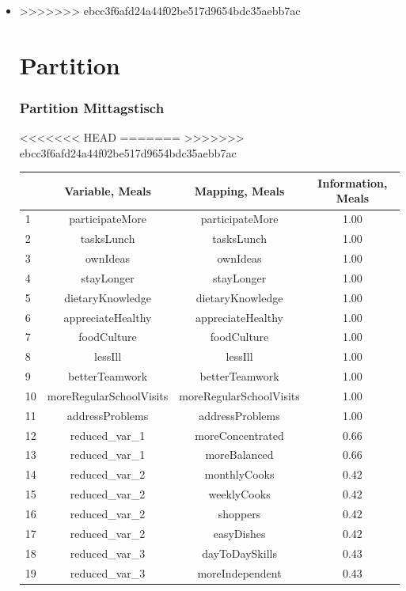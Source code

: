 \begin{frame}[fragile]
\begin{itemize}
\begin{frame}
\begin{itemize}
\item 
>>>>>>> ebcc3f6afd24a44f02be517d9654bdc35aebb7ac

\section{Partition}

 \begin{frame}[fragile]
 \frametitle{Partition Mittagstisch}
<<<<<<< HEAD
=======
>>>>>>> ebcc3f6afd24a44f02be517d9654bdc35aebb7ac
\begin{table}[ht]
\centering
\begin{tabular}{lccc}
  \hline
 & Variable, Meals & Mapping, Meals & Information, Meals \\ 
  \hline
1 & participateMore & participateMore & 1.00 \\ 
  2 & tasksLunch & tasksLunch & 1.00 \\ 
  3 & ownIdeas & ownIdeas & 1.00 \\ 
  4 & stayLonger & stayLonger & 1.00 \\ 
  5 & dietaryKnowledge & dietaryKnowledge & 1.00 \\ 
  6 & appreciateHealthy & appreciateHealthy & 1.00 \\ 
  7 & foodCulture & foodCulture & 1.00 \\ 
  8 & lessIll & lessIll & 1.00 \\ 
  9 & betterTeamwork & betterTeamwork & 1.00 \\ 
  10 & moreRegularSchoolVisits & moreRegularSchoolVisits & 1.00 \\ 
  11 & addressProblems & addressProblems & 1.00 \\ 
  12 & reduced\_var\_1 & moreConcentrated & 0.66 \\ 
  13 & reduced\_var\_1 & moreBalanced & 0.66 \\ 
  14 & reduced\_var\_2 & monthlyCooks & 0.42 \\ 
  15 & reduced\_var\_2 & weeklyCooks & 0.42 \\ 
  16 & reduced\_var\_2 & shoppers & 0.42 \\ 
  17 & reduced\_var\_2 & easyDishes & 0.42 \\ 
  18 & reduced\_var\_3 & dayToDaySkills & 0.43 \\ 
  19 & reduced\_var\_3 & moreIndependent & 0.43 \\ 

\end{tabular}
\end{table}
\end{frame}
\end{itemize}
\end{frame}
\end{itemize}
\end{frame}
